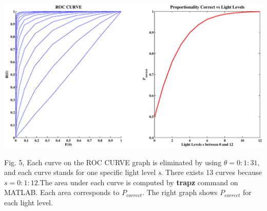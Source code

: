 \documentclass{article}
\begin{document}
\begin{center}
\includegraphics[width=\textwidth]{roc.eps}
\begin{footnotesize} Fig. 5, Each curve on the ROC CURVE graph is eliminated by using $\theta=0:1:31$, and each curve stands for one specific light level \textit{s}. There exists 13 curves because $s=0:1:12$.The area under each curve is computed by \textbf{trapz} command on MATLAB. Each area corresponds to $P_{correct}$. The right graph shows $P_{correct}$ for each light level.  
\end{footnotesize}
\end{center}
\end{document}
